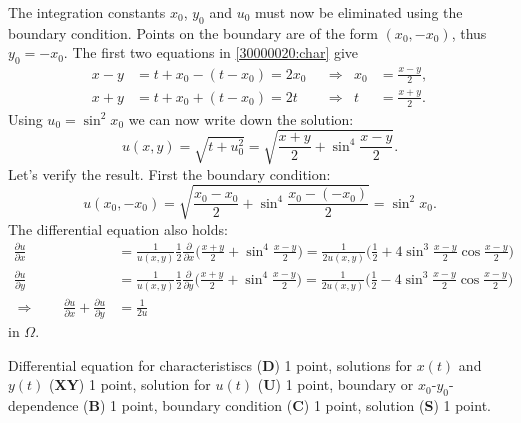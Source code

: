\begin{loesung}
The integration constants $x_0$, $y_0$ and $u_0$ must now be eliminated
using the boundary condition.
Points on the boundary are of the form $(x_0,-x_0)$, thus $y_0=-x_0$.
The first two equations in \eqref{30000020:char}
give
\begin{align*}
x-y &= t+x_0 - (t -x_0) = 2x_0
&&\Rightarrow&
x_0 &= \frac{x-y}2,
\\
x+y &= t+x_0 +(t-x_0) = 2t
&&\Rightarrow&
t&=\frac{x+y}2.
\end{align*}
Using
$u_0 = \sin^2 x_0$ we can now write down the solution:
\[
u(x,y)
=
\sqrt{t+u_0^2}
=
\sqrt{\frac{x+y}2 + \sin^4\frac{x-y}2}.
\]
Let's verify the result.
First the boundary condition:
\[
u(x_0,-x_0)
= 
\sqrt{\frac{x_0-x_0}2 + \sin^4\frac{x_0-(-x_0)}2}
=
\sin^2 x_0.
\]
The differential equation also holds:
\begin{align*}
\frac{\partial u}{\partial x}
&=
\frac{1}{u(x,y)} \frac12
\frac{\partial}{\partial x} \biggl(
\frac{x+y}2 + \sin^4\frac{x-y}2
\biggr)
=
\frac{1}{2u(x,y)} \biggl(
\frac12 + 4\sin^3\frac{x-y}2\cos\frac{x-y}2
\biggr)
\\
\frac{\partial u}{\partial y}
&=
\frac{1}{u(x,y)} \frac12
\frac{\partial}{\partial y} \biggl(
\frac{x+y}2 + \sin^4\frac{x-y}2
\biggr)
=
\frac{1}{2u(x,y)} \biggl(
\frac12 - 4\sin^3\frac{x-y}2\cos\frac{x-y}2
\biggr)
\\
\Rightarrow\qquad
\frac{\partial u}{\partial x} + \frac{\partial u}{\partial y}
&=
\frac{1}{2u}
\end{align*}
in $\Omega$.
\end{loesung}

\begin{bewertung}
Differential equation for characteristiscs ({\bf D}) 1 point,
solutions for $x(t)$ and $y(t)$ ({\bf XY}) 1 point,
solution for $u(t)$ ({\bf U}) 1 point,
boundary or $x_0$-$y_0$-dependence ({\bf B}) 1 point,
boundary condition ({\bf C}) 1 point,
solution ({\bf S}) 1 point.
\end{bewertung}
